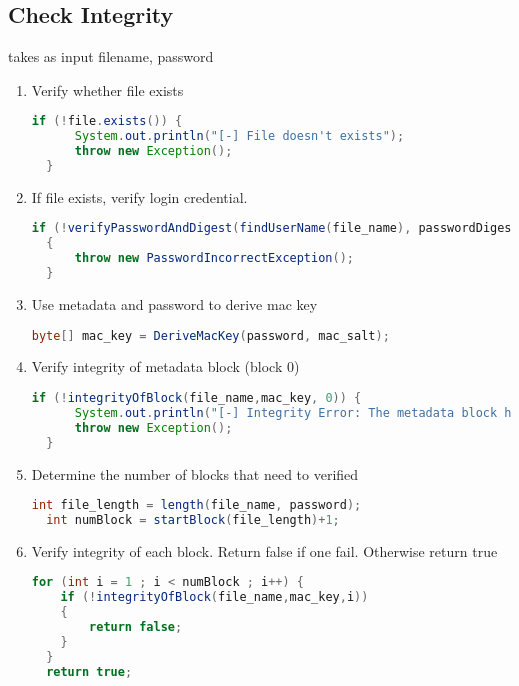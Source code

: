 \documentclass[a4paper,10pt]{article}
\begin{document}
\subsection{Check Integrity} %
\label{sub:check_integrity}
takes as input filename, password
\begin{enumerate}
  \item Verify whether file exists
  \begin{lstlisting}[linewidth=.5\columnwidth,breaklines=true,language=Java]
  if (!file.exists()) {
      System.out.println("[-] File doesn't exists");
      throw new Exception();
  }\end{lstlisting}
  \item If file exists, verify login credential.
  \begin{lstlisting}[linewidth=\columnwidth,breaklines=true,language=Java]
  if (!verifyPasswordAndDigest(findUserName(file_name), passwordDigest, passwd_salt, password))
  {
      throw new PasswordIncorrectException();    
  }\end{lstlisting}
  \item Use metadata and password to derive mac key
  \begin{lstlisting}[linewidth=.5\columnwidth,breaklines=true,language=Java]
  byte[] mac_key = DeriveMacKey(password, mac_salt);\end{lstlisting}
  \item Verify integrity of metadata block (block 0)
  \begin{lstlisting}[linewidth=\columnwidth,breaklines=true,language=Java]
  if (!integrityOfBlock(file_name,mac_key, 0)) {
      System.out.println("[-] Integrity Error: The metadata block has been modified");
      throw new Exception();
  }\end{lstlisting}

  \item Determine the number of blocks that need to verified
  \begin{lstlisting}[linewidth=\columnwidth,breaklines=true,language=Java]
  int file_length = length(file_name, password);
  int numBlock = startBlock(file_length)+1;\end{lstlisting}
  \item Verify integrity of each block. Return false if one fail. Otherwise return true
  \begin{lstlisting}[linewidth=\columnwidth,breaklines=true,language=Java]
  for (int i = 1 ; i < numBlock ; i++) {
    if (!integrityOfBlock(file_name,mac_key,i)) 
    {
        return false;
    }
  }
  return true;\end{lstlisting}
\end{enumerate}
\end{document}
